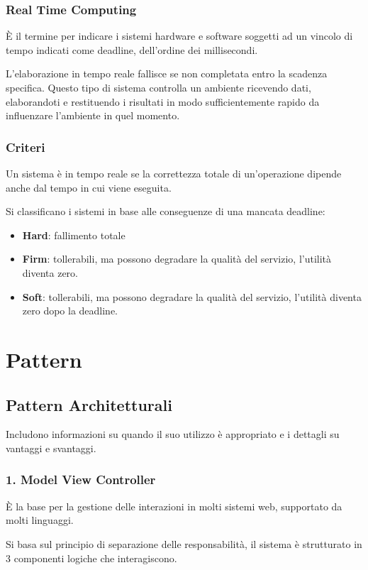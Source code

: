 \documentclass{report}
\begin{document}
\subsection*{Real Time Computing}
\`E il termine per indicare i sistemi hardware e software soggetti ad un vincolo di tempo indicati come deadline, dell'ordine dei millisecondi.

\noindent
L'elaborazione in tempo reale fallisce se non completata entro la scadenza specifica. Questo tipo di sistema controlla un ambiente ricevendo dati, elaborandoti e restituendo i risultati in modo sufficientemente rapido da influenzare l'ambiente in quel momento.

\newpage
\subsection*{Criteri}
Un sistema è in tempo reale se la correttezza totale di un'operazione dipende anche dal tempo in cui viene eseguita.

\noindent
Si classificano i sistemi in base alle conseguenze di una mancata deadline:
\begin{itemize}
    \item \textbf{Hard}: fallimento totale
    \item \textbf{Firm}: tollerabili, ma possono degradare la qualità del servizio, l'utilità diventa zero.
    \item \textbf{Soft}: tollerabili, ma possono degradare la qualità del servizio, l'utilità diventa zero dopo la deadline.
\end{itemize}

\chapter{Pattern}
\section{Pattern Architetturali}
Includono informazioni su quando il suo utilizzo è appropriato e i dettagli su vantaggi e svantaggi.

\subsection*{1. Model View Controller}
\`E la base per la gestione delle interazioni in molti sistemi web, supportato da molti linguaggi.

\noindent
Si basa sul principio di separazione delle responsabilità, il sistema è strutturato in 3 componenti logiche che interagiscono.
\end{document}

